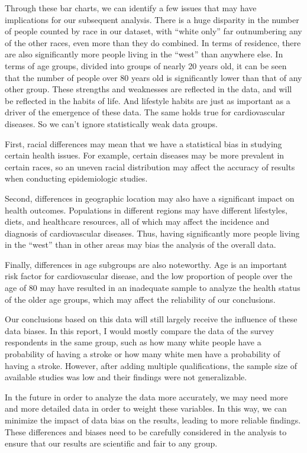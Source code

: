 \documentclass{article}
\begin{document}
Through these bar charts, we can identify a few issues that may have implications for our subsequent analysis. There is a huge disparity in the number of people counted by race in our dataset, with “white only” far outnumbering any of the other races, even more than they do combined. In terms of residence, there are also significantly more people living in the “west” than anywhere else. In terms of age groups, divided into groups of nearly 20 years old, it can be seen that the number of people over 80 years old is significantly lower than that of any other group. These strengths and weaknesses are reflected in the data, and will be reflected in the habits of life. And lifestyle habits are just as important as a driver of the emergence of these data. The same holds true for cardiovascular diseases. So we can't ignore statistically weak data groups.

First, racial differences may mean that we have a statistical bias in studying certain health issues. For example, certain diseases may be more prevalent in certain races, so an uneven racial distribution may affect the accuracy of results when conducting epidemiologic studies.

Second, differences in geographic location may also have a significant impact on health outcomes. Populations in different regions may have different lifestyles, diets, and healthcare resources, all of which may affect the incidence and diagnosis of cardiovascular diseases. Thus, having significantly more people living in the “west” than in other areas may bias the analysis of the overall data.

Finally, differences in age subgroups are also noteworthy. Age is an important risk factor for cardiovascular disease, and the low proportion of people over the age of 80 may have resulted in an inadequate sample to analyze the health status of the older age groups, which may affect the reliability of our conclusions.

Our conclusions based on this data will still largely receive the influence of these data biases. In this report, I would mostly compare the data of the survey respondents in the same group, such as how many white people have a probability of having a stroke or how many white men have a probability of having a stroke. However, after adding multiple qualifications, the sample size of available studies was low and their findings were not generalizable.

In the future in order to analyze the data more accurately, we may need more and more detailed data in order to weight these variables. In this way, we can minimize the impact of data bias on the results, leading to more reliable findings. These differences and biases need to be carefully considered in the analysis to ensure that our results are scientific and fair to any group.
\end{document}
